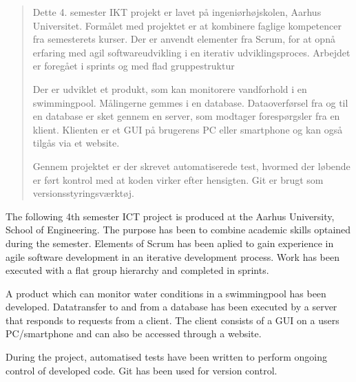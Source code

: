 \abstractintoc
\abstractcol
\setlength{\abstitleskip}{-18pt}


\begin{abstract}
Dette 4. semester IKT projekt er lavet på ingeniørhøjskolen, Aarhus Universitet. Formålet med projektet er at kombinere faglige kompetencer fra semesterets kurser. Der er anvendt elementer fra Scrum, for at opnå erfaring med agil softwareudvikling i en iterativ udviklingsproces. Arbejdet er foregået i sprints og med flad gruppestruktur

Der er udviklet et produkt, som kan monitorere vandforhold i en swimmingpool. Målingerne gemmes i en database. Dataoverførsel fra og til en database er sket gennem en server, som modtager forespørgsler fra en klient. Klienten er et GUI på brugerens PC eller smartphone og kan også tilgås via et website.

Gennem projektet er der skrevet automatiserede test, hvormed der løbende er ført kontrol med at koden virker efter hensigten. Git er brugt som versionsstyringsværktøj. 
\end{abstract}

\begin{abstracten}
The following 4th semester ICT project is produced at the Aarhus University, School of Engineering. The purpose has been to combine academic skills optained during the semester. Elements of Scrum has been aplied to gain experience in agile software development in an iterative development process. Work has been executed with a flat group hierarchy and completed in sprints.

A product which can monitor water conditions in a swimmingpool has been developed. Datatransfer to and from a database has been executed by a server that responds to requests from a client. The client consists of a GUI on a users PC/smartphone and can also be accessed through a website.

During the project, automatised tests have been written to perform ongoing control of developed code. Git has been used for version control. 
\end{abstracten}